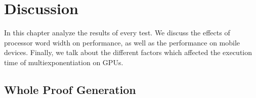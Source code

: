 
\chapter{Discussion} %

\label{Chapter7} %

In this chapter analyze the results of every test. We discuss the effects of processor word width on performance, as well as the performance on mobile devices. Finally, we talk about the different factors which affected the execution time of multiexponentiation on GPUs.

\section{Whole Proof Generation}
\label{wholeproof}

